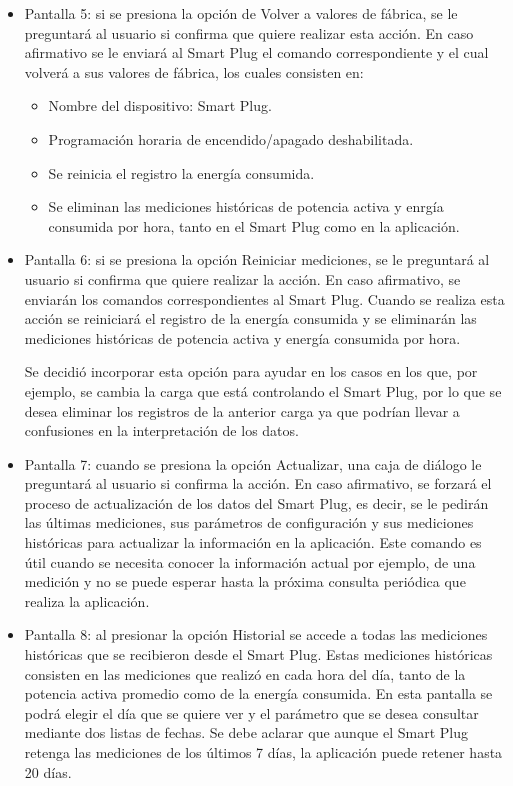 \begin{itemize}
\item Pantalla 5: si se presiona la opción de Volver a valores de fábrica, se le preguntará al usuario si confirma que quiere realizar esta acción. En caso afirmativo se le enviará al Smart Plug el comando correspondiente y el cual volverá a sus valores de fábrica, los cuales consisten en:

\begin{itemize}
\item Nombre del dispositivo: Smart Plug.
\item Programación horaria de encendido/apagado deshabilitada.
\item Se reinicia el registro la energía consumida.
\item Se eliminan las mediciones históricas de potencia activa y enrgía consumida por hora, tanto en el Smart Plug como en la aplicación.
\end{itemize}

\item Pantalla 6: si se presiona la opción Reiniciar mediciones, se le preguntará al usuario si confirma que quiere realizar la acción. En caso afirmativo, se enviarán los comandos correspondientes al Smart Plug. Cuando se realiza esta acción se reiniciará el registro de la energía consumida y se eliminarán las mediciones históricas de potencia activa y energía consumida por hora. 

Se decidió incorporar esta opción para ayudar en los casos en los que, por ejemplo, se cambia la carga que está controlando el Smart Plug, por lo que se desea eliminar los registros de la anterior carga ya que podrían llevar a confusiones en la interpretación de los datos.

\item Pantalla 7: cuando se presiona la opción Actualizar, una caja de diálogo le preguntará al usuario si confirma la acción. En caso afirmativo, se forzará el proceso de actualización de los datos del Smart Plug, es decir, se le pedirán las últimas mediciones, sus parámetros de configuración y sus mediciones históricas para actualizar la información en la aplicación. Este comando es útil cuando se necesita conocer la información actual por ejemplo, de una medición y no se puede esperar hasta la próxima consulta periódica que realiza la aplicación.

\item Pantalla 8: al presionar la opción Historial se accede a todas las mediciones históricas que se recibieron desde el Smart Plug. Estas mediciones históricas consisten en las mediciones que realizó en cada hora del día, tanto de la potencia activa promedio como de la energía consumida. En esta pantalla se podrá elegir el día que se quiere ver y el parámetro que se desea consultar mediante dos listas de fechas. Se debe aclarar que aunque el Smart Plug retenga las mediciones de los últimos 7 días, la aplicación puede retener hasta 20 días.


\end{itemize}
